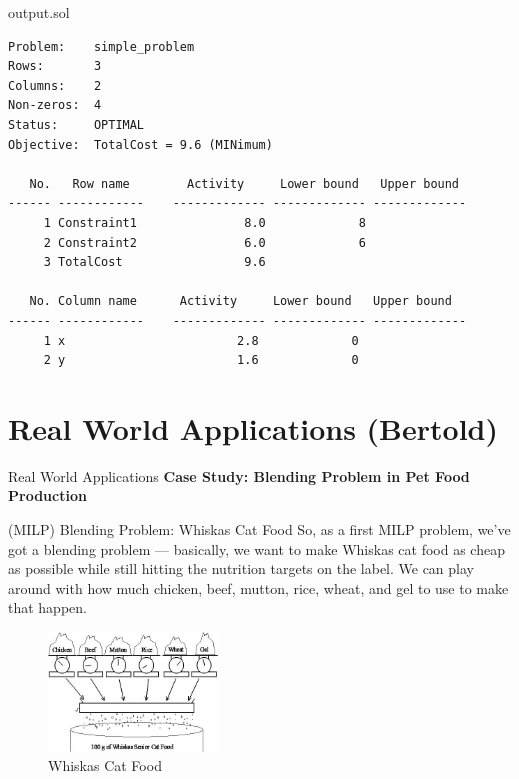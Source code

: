 \documentclass{purdue-slide}
\begin{document}
\begin{frame}[fragile]{output.sol}
\begin{verbatim}
Problem:    simple_problem
Rows:       3
Columns:    2
Non-zeros:  4
Status:     OPTIMAL
Objective:  TotalCost = 9.6 (MINimum)

   No.   Row name        Activity     Lower bound   Upper bound
------ ------------    ------------- ------------- -------------
     1 Constraint1               8.0             8
     2 Constraint2               6.0             6
     3 TotalCost                 9.6

   No. Column name      Activity     Lower bound   Upper bound
------ ------------    ------------- ------------- -------------
     1 x                        2.8             0
     2 y                        1.6             0	
\end{verbatim}	
\end{frame}

\section{Real World Applications (Bertold)}

\begin{titleframe}{Real World Applications}
	\textbf{Case Study: Blending Problem in Pet Food Production}
\end{titleframe}

\begin{frame}{(MILP) Blending Problem: Whiskas Cat Food}
	So, as a first MILP problem, we've
	got a blending problem —
	basically, we want to make
	Whiskas cat food as cheap as
	possible while still hitting the
	nutrition targets on the label. We
	can play around with how much
	chicken, beef, mutton, rice, wheat,
	and gel to use to make that
	happen.

	\begin{figure}[H]
		\centering
		\includegraphics[width=0.4\textwidth]{pics/whiskas_blend_intro.jpg}
		\caption{Whiskas Cat Food}
	\end{figure}
\end{frame}
\end{document}
